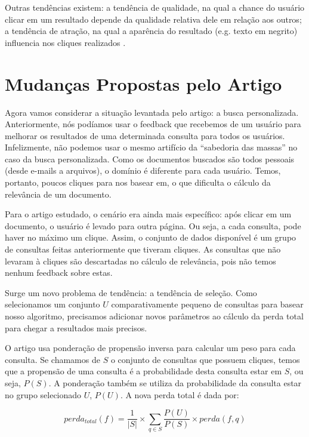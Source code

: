 \documentclass{svproc}
\begin{document}
Outras tendências existem: a tendência de qualidade, na qual a chance do usuário clicar em um resultado
depende da qualidade relativa dele em relação aos outros; a tendência de atração, na qual a aparência do resultado 
(e.g. texto em negrito) influencia nos cliques realizados \cite{yue:patel:roehrig}.


\section{Mudanças Propostas pelo Artigo}

Agora vamos considerar a situação levantada pelo artigo: a busca personalizada. Anteriormente, nós podíamos usar o feedback
que recebemos de um usuário para melhorar os resultados de uma determinada consulta para todos os usuários. Infelizmente,
não podemos usar o mesmo artifício da ``sabedoria das massas'' no caso da busca personalizada. Como os documentos buscados
são todos pessoais (desde e-mails a arquivos), o domínio é diferente para cada usuário. Temos, portanto, poucos cliques para
nos basear em, o que dificulta o cálculo da relevância de um documento.

Para o artigo estudado, o cenário era ainda mais específico: após clicar em um documento, o usuário é levado para outra página.
Ou seja, a cada consulta, pode haver no máximo um clique. Assim, o conjunto de dados disponível é um grupo de consultas feitas 
anteriormente que tiveram cliques. As consultas que não levaram à cliques são descartadas no cálculo de relevância, pois não 
temos nenhum feedback sobre estas.

Surge um novo problema de tendência: a tendência de seleção. Como selecionamos um conjunto $U$ comparativamente pequeno de 
consultas para basear nosso algoritmo, precisamos adicionar novos parâmetros ao cálculo da perda total para chegar a 
resultados mais precisos.

O artigo usa ponderação de propensão inversa para calcular um peso para cada consulta. Se chamamos de $S$ o conjunto de 
consultas que possuem cliques, temos que a propensão de uma consulta é a probabilidade desta consulta estar em $S$, ou
seja, $P(S)$. A ponderação também se utiliza da probabilidade da consulta estar no grupo selecionado $U$, $P(U)$.
A nova perda total é dada por:

\begin{equation}
perda_{total}(f) = \frac{1}{|S|}\times \sum_{q \in S} \frac{P(U)}{P(S)} \times perda(f, q)
\end{equation}
\end{document}
